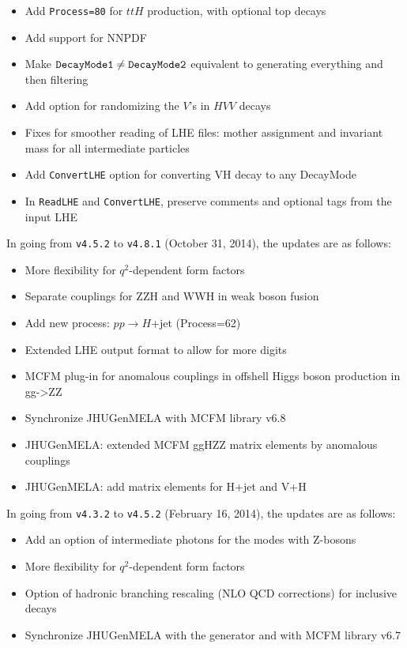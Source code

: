 \documentclass[aps,superscriptaddress,nofootinbib]{revtex4}
\begin{document}
\begin{itemize}
\item Add \verb|Process=80| for $ttH$ production, with optional top decays
\item Add support for NNPDF
\item Make $\verb|DecayMode1|\ne\verb|DecayMode2|$ equivalent to generating everything and then filtering
\item Add option for randomizing the $V$'s in $HVV$ decays
\item Fixes for smoother reading of LHE files: mother assignment and invariant mass for all intermediate particles
\item Add \verb|ConvertLHE| option for converting VH decay to any DecayMode
\item In \verb|ReadLHE| and \verb|ConvertLHE|, preserve comments and optional tags from the input LHE
\end{itemize}
\noindent
In going from \verb|v4.5.2| to \verb|v4.8.1| (October 31, 2014), the updates are as follows:
\begin{itemize}
\item More flexibility for $q^2$-dependent form factors
\item Separate couplings for ZZH and WWH in weak boson fusion
\item Add new process: $pp\to H$+jet (Process=62)
\item Extended LHE output format to allow for more digits
\item MCFM plug-in for anomalous couplings in offshell Higgs boson production in gg->ZZ
\item Synchronize JHUGenMELA with MCFM library v6.8
\item JHUGenMELA: extended MCFM ggHZZ matrix elements by anomalous couplings
\item JHUGenMELA: add matrix elements for H+jet and V+H
\end{itemize}
\noindent
In going from \verb|v4.3.2| to \verb|v4.5.2| (February 16, 2014), the updates are as follows:
\begin{itemize}
\item Add an option of intermediate photons for the modes with Z-bosons
\item More flexibility for $q^2$-dependent form factors
\item Option of hadronic branching rescaling (NLO QCD corrections) for inclusive decays
\item Synchronize JHUGenMELA with the generator and with MCFM library v6.7
\end{itemize}
\end{document}

